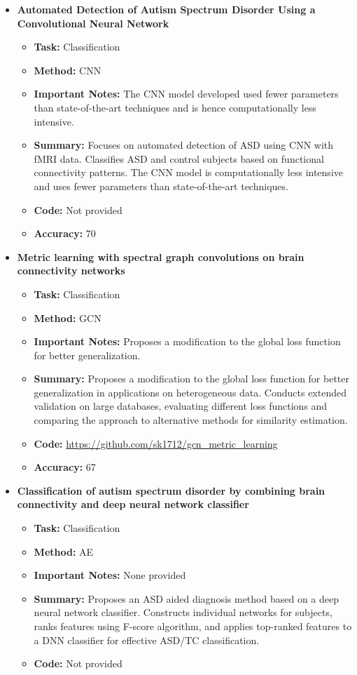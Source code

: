 \documentclass{article}
\begin{document}
\begin{itemize}[left=0pt]
  \item \textbf{Automated Detection of Autism Spectrum Disorder Using a Convolutional Neural Network}
  \begin{itemize}
    \item \textbf{Task:} Classification
    \item \textbf{Method:} CNN
    \item \textbf{Important Notes:} The CNN model developed used fewer parameters than state-of-the-art techniques and is hence computationally less intensive.
    \item \textbf{Summary:} Focuses on automated detection of ASD using CNN with fMRI data. Classifies ASD and control subjects based on functional connectivity patterns. The CNN model is computationally less intensive and uses fewer parameters than state-of-the-art techniques.
    \item \textbf{Code:} Not provided
    \item \textbf{Accuracy:} 70
  \end{itemize}

  \item \textbf{Metric learning with spectral graph convolutions on brain connectivity networks}
  \begin{itemize}
    \item \textbf{Task:} Classification
    \item \textbf{Method:} GCN
    \item \textbf{Important Notes:} Proposes a modification to the global loss function for better generalization.
    \item \textbf{Summary:} Proposes a modification to the global loss function for better generalization in applications on heterogeneous data. Conducts extended validation on large databases, evaluating different loss functions and comparing the approach to alternative methods for similarity estimation.
    \item \textbf{Code:} \url{https://github.com/sk1712/gcn_metric_learning}
    \item \textbf{Accuracy:} 67
  \end{itemize}

  \item \textbf{Classification of autism spectrum disorder by combining brain connectivity and deep neural network classifier}
  \begin{itemize}
    \item \textbf{Task:} Classification
    \item \textbf{Method:} AE
    \item \textbf{Important Notes:} None provided
    \item \textbf{Summary:} Proposes an ASD aided diagnosis method based on a deep neural network classifier. Constructs individual networks for subjects, ranks features using F-score algorithm, and applies top-ranked features to a DNN classifier for effective ASD/TC classification.
    \item \textbf{Code:} Not provided
  \end{itemize}


\end{itemize}
\end{document}
